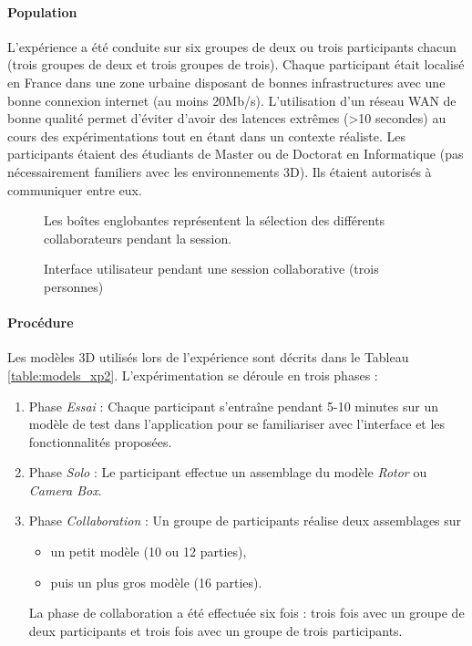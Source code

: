 \paragraph{Population}
L'expérience a été conduite sur six groupes de deux ou trois participants chacun 
(trois groupes de deux et trois groupes de trois). 
Chaque participant était localisé en France dans une zone urbaine disposant de 
bonnes infrastructures avec une bonne connexion 
internet (au moins 20Mb/s). L'utilisation d'un réseau \gls{WAN} de bonne qualité 
permet d'éviter d'avoir des latences extrêmes (>10 secondes) au cours 
des expérimentations tout en étant dans un contexte réaliste. 
Les participants étaient des étudiants de Master ou de Doctorat en Informatique 
(pas nécessairement familiers avec les environnements 
3D). Ils étaient autorisés à communiquer entre eux.

\begin{figure}[ht!]
	\centering
	
	\hfill
	\hfill
	\hfill
	\caption{Interface utilisateur pendant une session collaborative (trois 
	personnes)}{Les boîtes englobantes représentent la sélection des différents 
	collaborateurs pendant la session.}
	\label{fig:screenshots}
\end{figure}

\paragraph{Procédure}
Les modèles \gls{3D} utilisés lors de l'expérience sont décrits dans le Tableau 
\ref{table:models_xp2}. L'expérimentation se déroule en trois phases : 
\begin{enumerate}
	\item Phase \textit{Essai} : Chaque participant s'entraîne pendant 5-10 minutes 
	sur un 
	modèle de test dans l'application pour se familiariser avec l'interface et les 
	fonctionnalités proposées.
	\item Phase \textit{Solo} : Le participant effectue un assemblage du modèle 
	\textit{Rotor} ou 
	\textit{Camera Box}.
	\item Phase \textit{Collaboration} : Un groupe de participants réalise deux 
	assemblages sur 
	\begin{itemize}
		\item un petit modèle (10 ou 12 parties), 
		\item puis un plus gros modèle (16 parties).
	\end{itemize}
	La phase de collaboration a été effectuée six fois : trois fois 
	avec un groupe de deux participants et trois fois avec un groupe de trois 
	participants.
\end{enumerate}

